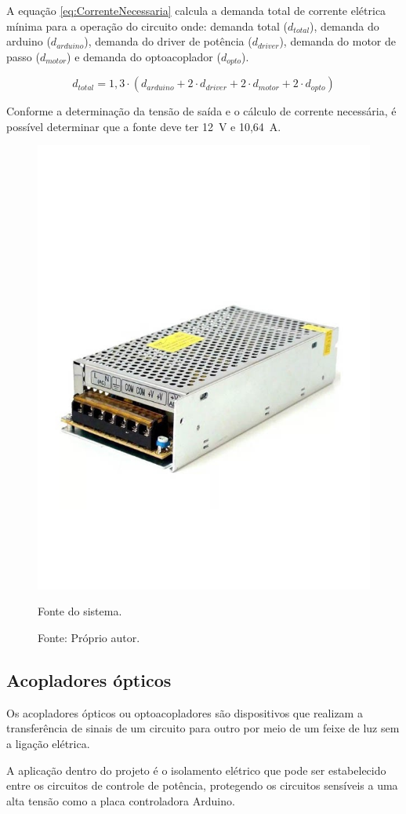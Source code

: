 A equação \ref{eq:CorrenteNecessaria} calcula a demanda total de 
corrente elétrica mínima para a operação do circuito onde:
demanda total ($d_{total}$), demanda do arduino ($d_{arduino}$), demanda do driver de potência ($d_{driver}$),
demanda do motor de passo ($d_{motor}$) e demanda do optoacoplador ($d_{opto}$).

\begin{equation}\label{eq:CorrenteNecessaria}
    d_{total} = 1,3 \cdot (d_{arduino} + 2 \cdot d_{driver} + 2 \cdot d_{motor} + 2 \cdot d_{opto})    
\end{equation}

Conforme a determinação da tensão de saída e o cálculo de corrente necessária, 
é possível determinar que a fonte deve ter 12~V e 10,64~A.

\begin{figure}[H]
\centering
\includegraphics[width = 0.5\linewidth]{figuras/fonte}
\caption{Fonte do sistema.}
\caption*{Fonte: Próprio autor.}
\label{fig:fonte}
\end{figure}
    
\subsection{Acopladores ópticos}\label{subsec:metacoplador}

Os acopladores ópticos ou optoacopladores são dispositivos que realizam a transferência de 
sinais de um circuito para outro por meio de um feixe de luz sem a ligação elétrica.

A aplicação dentro do projeto é o isolamento elétrico que pode ser estabelecido entre 
os circuitos de controle de potência, protegendo os circuitos sensíveis a uma alta tensão 
como a placa controladora Arduino.

